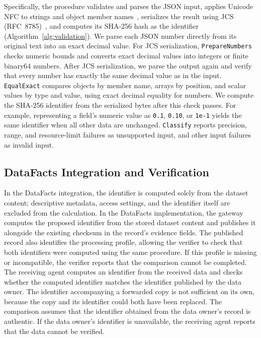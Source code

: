 \documentclass[conference]{IEEEtran}
\begin{document}
Specifically, the procedure validates and parses the JSON input, applies Unicode NFC to strings and object member names~\cite{uax15}, serializes the result using JCS (RFC~8785)~\cite{rfc8785}, and computes its SHA-256 hash as the identifier (Algorithm~\ref{alg:validation}).
We parse each JSON number directly from its original text into an exact decimal value.
For JCS serialization, \texttt{PrepareNumbers} checks numeric bounds and converts exact decimal values into integers or finite binary64 numbers.
After JCS serialization, we parse the output again and verify that every number has exactly the same decimal value as in the input.
\texttt{EqualExact} compares objects by member name, arrays by position, and scalar values by type and value, using exact decimal equality for numbers.
We compute the SHA-256 identifier from the serialized bytes after this check passes.
For example, representing a field's numeric value as \texttt{0.1}, \texttt{0.10}, or \texttt{1e-1} yields the same identifier when all other data are unchanged.
\texttt{Classify} reports precision, range, and resource-limit failures as unsupported input, and other input failures as invalid input.

\begin{algorithm}[t]
\centering

\label{alg:validation}
\end{algorithm}

\subsection{DataFacts Integration and Verification}
In the DataFacts integration, the identifier is computed solely from the dataset content; descriptive metadata, access settings, and the identifier itself are excluded from the calculation.
In the DataFacts implementation, the gateway computes the proposed identifier from the stored dataset content and publishes it alongside the existing checksum in the record's evidence fields.
The published record also identifies the processing profile, allowing the verifier to check that both identifiers were computed using the same procedure.
If this profile is missing or incompatible, the verifier reports that the comparison cannot be completed.
The receiving agent computes an identifier from the received data and checks whether the computed identifier matches the identifier published by the data owner.
The identifier accompanying a forwarded copy is not sufficient on its own, because the copy and its identifier could both have been replaced.
The comparison assumes that the identifier obtained from the data owner's record is authentic.
If the data owner's identifier is unavailable, the receiving agent reports that the data cannot be verified.
\end{document}
